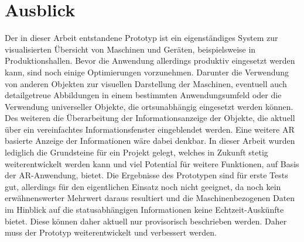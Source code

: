 \chapter{Ausblick}
\label{chap:Ausblick}
Der in dieser Arbeit entstandene Prototyp ist ein eigenständiges System zur visualisierten Übersicht von Maschinen und Geräten, beispielsweise in Produktionshallen. 
Bevor die Anwendung allerdings produktiv eingesetzt werden kann, sind noch einige Optimierungen vorzunehmen. Darunter die Verwendung von anderen Objekten 
zur visuellen Darstellung der Maschinen, eventuell auch detailgetreue Abbildungen in einem bestimmten Anwendungsumfeld oder die Verwendung universeller Objekte, die 
ortsunabhängig eingesetzt werden können. Des weiteren die Überarbeitung der Informationsanzeige der Objekte, die aktuell über ein vereinfachtes Informationsfenster 
eingeblendet werden. Eine weitere \acl{AR} basierte Anzeige der Informationen wäre dabei denkbar. In dieser Arbeit wurden lediglich die Grundsteine für ein Projekt 
gelegt, welches in Zukunft stetig weiterentwickelt werden kann und viel Potential für weitere Funktionen, auf Basis der \acs{AR}-Anwendung, bietet. Die Ergebnisse 
des Prototypen sind für erste Tests gut, allerdings für den eigentlichen Einsatz noch nicht geeignet, da noch kein erwähnenswerter Mehrwert daraus resultiert und die 
Maschinenbezogenen Daten im Hinblick auf die statusabhängigen Informationen keine Echtzeit-Auskünfte bietet. Diese können daher aktuell nur provisorisch beschrieben 
werden. Daher muss der Prototyp weiterentwickelt und verbessert werden. 
\\ 
\linebreak
  
